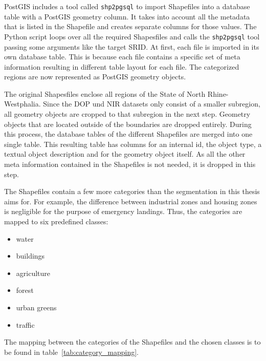 PostGIS includes a tool called \texttt{shp2pgsql} to import Shapefiles into a database table with a PostGIS geometry column. It takes into account all the metadata that is listed in the Shapefile and creates separate columns for those values. The Python script loops over all the required Shapesfiles and calls the \texttt{shp2pgsql} tool passing some arguments like the target SRID. At first, each file is imported in its own database table. This is because each file contains a specific set of meta information resulting in different table layout for each file. The categorized regions are now represented as PostGIS geometry objects.

The original Shapesfiles enclose all regions of the State of North Rhine-Westphalia. Since the DOP und NIR datasets only consist of a smaller subregion, all geometry objects are cropped to that subregion in the next step. Geometry objects that are located outside of the boundaries are dropped entirely. During this process, the database tables of the different Shapefiles are merged into one single table. This resulting table has columns for an internal id, the object type, a textual object description and for the geometry object itself. As all the other meta information contained in the Shapefiles is not needed, it is dropped in this step.

The Shapefiles contain a few more categories than the segmentation in this thesis aims for. For example, the difference between industrial zones and housing zones is negligible for the purpose of emergency landings. Thus, the categories are mapped to six predefined classes:
\begin{itemize}
  \setlength\itemsep{1mm}
  \item water
  \item buildings
  \item agriculture
  \item forest
  \item urban greens
  \item traffic
\end{itemize}
The mapping between the categories of the Shapefiles and the chosen classes is to be found in table~\ref{tab:category_mapping}.

